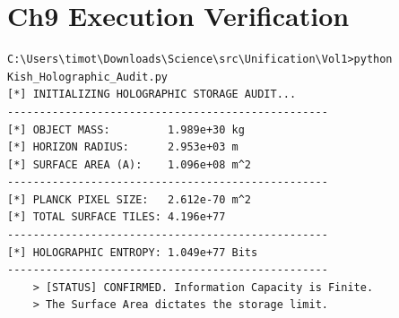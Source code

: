 \documentclass[11pt, letterpaper, openany]{book}
\begin{document}
\chapter{Ch9 Execution Verification}
\begin{lstlisting}[style=terminal, caption={Terminal Output: Kish\_Holographic\_Audit.py}]
C:\Users\timot\Downloads\Science\src\Unification\Vol1>python Kish_Holographic_Audit.py
[*] INITIALIZING HOLOGRAPHIC STORAGE AUDIT...
--------------------------------------------------
[*] OBJECT MASS:         1.989e+30 kg
[*] HORIZON RADIUS:      2.953e+03 m
[*] SURFACE AREA (A):    1.096e+08 m^2
--------------------------------------------------
[*] PLANCK PIXEL SIZE:   2.612e-70 m^2
[*] TOTAL SURFACE TILES: 4.196e+77
--------------------------------------------------
[*] HOLOGRAPHIC ENTROPY: 1.049e+77 Bits
--------------------------------------------------
    > [STATUS] CONFIRMED. Information Capacity is Finite.
    > The Surface Area dictates the storage limit.
\end{lstlisting}
\end{document}

